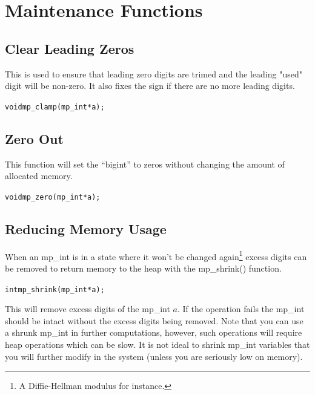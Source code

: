 \documentclass[synpaper]{book}
\begin{document}
\section{Maintenance Functions}
\subsection{Clear Leading Zeros}

This is used to ensure that leading zero digits are trimed and the leading "used" digit will be non-zero.
It also fixes the sign if there are no more leading digits.

\begin{alltt}
void mp_clamp(mp_int *a);
\end{alltt}

\subsection{Zero Out}

This function will set the ``bigint'' to zeros without changing the amount of allocated memory.

\begin{alltt}
void mp_zero(mp_int *a);
\end{alltt}

\subsection{Reducing Memory Usage}
When an mp\_int is in a state where it won't be changed again\footnote{A Diffie-Hellman modulus for instance.} excess
digits can be removed to return memory to the heap with the mp\_shrink() function.

\begin{alltt}
int mp_shrink (mp_int * a);
\end{alltt}

This will remove excess digits of the mp\_int $a$.  If the operation fails the mp\_int should be intact without the
excess digits being removed.  Note that you can use a shrunk mp\_int in further computations, however, such operations
will require heap operations which can be slow.  It is not ideal to shrink mp\_int variables that you will further
modify in the system (unless you are seriously low on memory).
\end{document}

